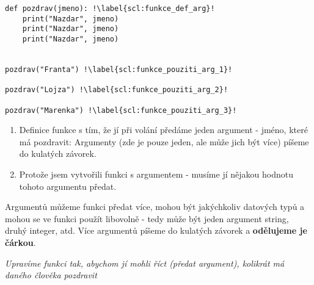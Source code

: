 \begin{minipage}[t]{.45\textwidth}
\begin{code}
\begin{verbatim}
def pozdrav(jmeno):	!\label{scl:funkce_def_arg}!
	print("Nazdar", jmeno) 
	print("Nazdar", jmeno)
	print("Nazdar", jmeno)
	
	
pozdrav("Franta") !\label{scl:funkce_pouziti_arg_1}!

pozdrav("Lojza") !\label{scl:funkce_pouziti_arg_2}!

pozdrav("Marenka") !\label{scl:funkce_pouziti_arg_3}!
\end{verbatim}

\label{code:funkce_arg}
\end{code}
\end{minipage}
\begin{minipage}[t]{.45\textwidth}
\begin{enumerate}
\item[ř. \ref{scl:funkce_def_arg}:] Definice funkce s tím, že jí při volání předáme jeden argument - jméno, které má pozdravit: Argumenty (zde je pouze jeden, ale může jich být více) píšeme do kulatých závorek.
\item[ř. \ref{scl:funkce_pouziti_arg_1}, \ref{scl:funkce_pouziti_arg_2}, \ref{scl:funkce_pouziti_arg_3}:] Protože jsem vytvořili funkci s argumentem - musíme jí nějakou hodnotu tohoto argumentu předat.
\end{enumerate}
\end{minipage}

Argumentů můžeme funkci předat více, mohou být jakýchkoliv datových typů a mohou se ve funkci použít libovolně - tedy může být jeden argument string, druhý integer, atd. Více argumentů píšeme do kulatých závorek a \textbf{odělujeme je čárkou}.

\vspace{1cm}
\textit{Upravíme funkci tak, abychom jí mohli říct (předat argument), kolikrát má daného člověka pozdravit}\\

